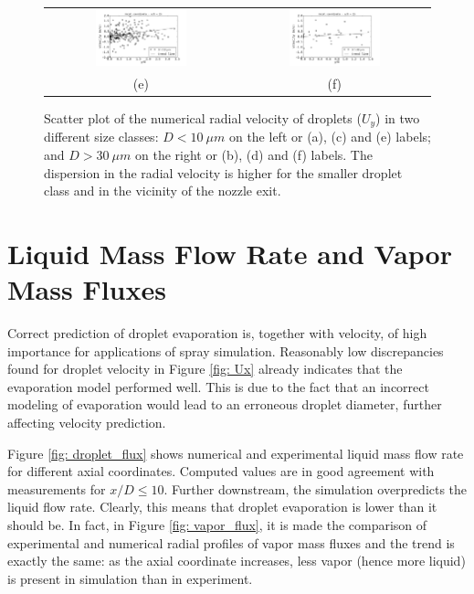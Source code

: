 \begin{figure}[!htb]
\begin{tabular}{cc}
 \includegraphics[width=0.5\textwidth]{./figuras/chap5/dispersion/class0_25.png} & \includegraphics[width=0.5\textwidth]{./figuras/chap5/dispersion/class4_25.png} \\
(e) & (f)
\end{tabular}
 \caption{Scatter plot of the numerical radial velocity of droplets ($U_{y}$) in two different size classes: $D< 10\ \mu m$ on the left or (a), (c) and (e) labels; and $D> 30\ \mu m$ on the right or (b), (d) and (f) labels. The dispersion in the radial velocity is higher for the smaller droplet class and in the vicinity of the nozzle exit.}
\label{fig: jointUV}
\end{figure}

\FloatBarrier
\section{Liquid Mass Flow Rate and Vapor Mass Fluxes}

Correct prediction of droplet evaporation is, together with velocity, of high importance for applications of spray simulation. Reasonably low discrepancies found for droplet velocity in Figure \ref{fig: Ux} already indicates that the evaporation model performed well. This is due to the fact that an incorrect modeling of evaporation would lead to an erroneous droplet diameter, further affecting velocity prediction.

Figure \ref{fig: droplet_flux} shows numerical and experimental liquid mass flow rate for different axial coordinates. Computed values are in good agreement with measurements for $x/D \le 10$. Further downstream, the simulation overpredicts the liquid flow rate. Clearly, this means that droplet evaporation is lower than it should be. In fact, in Figure \ref{fig: vapor_flux}, it is made the comparison of experimental and numerical radial profiles of vapor mass fluxes and the trend is exactly the same: as the axial coordinate increases, less vapor (hence more liquid) is present in simulation than in experiment.

